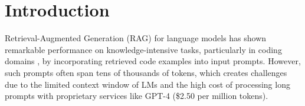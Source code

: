 

\section{Introduction}\label{sec:intro}


Retrieval-Augmented Generation (RAG) for language models \citep{rag,rag2,recomp} has shown remarkable performance on knowledge-intensive tasks, particularly in coding domains \citep{UBC,allyouneed,he2024}, by incorporating retrieved code examples into input prompts. However, such prompts often span tens of thousands of tokens, which creates challenges due to the limited context window of LMs and the high cost of processing long prompts with proprietary services like GPT-4 (\$2.50 per million tokens).

